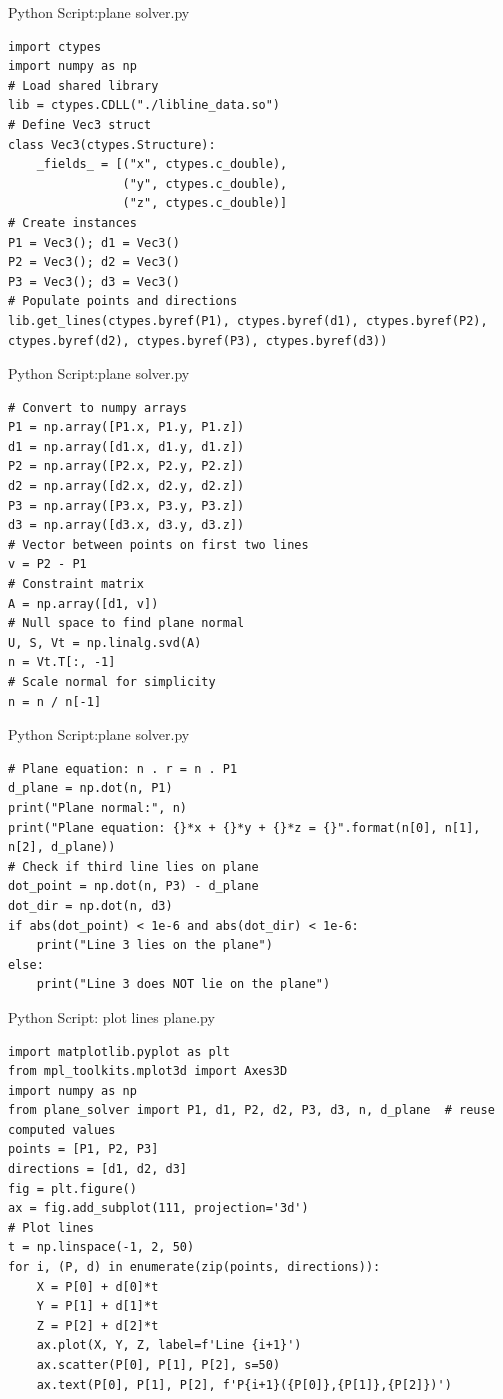 \documentclass{beamer}
\numberwithin{equation}{section}
\theoremstyle{remark}
\begin{document}
\begin{frame}[fragile]{Python Script:plane solver.py}
\begin{verbatim}
import ctypes
import numpy as np
# Load shared library
lib = ctypes.CDLL("./libline_data.so")
# Define Vec3 struct
class Vec3(ctypes.Structure):
    _fields_ = [("x", ctypes.c_double),
                ("y", ctypes.c_double),
                ("z", ctypes.c_double)]
# Create instances
P1 = Vec3(); d1 = Vec3()
P2 = Vec3(); d2 = Vec3()
P3 = Vec3(); d3 = Vec3()
# Populate points and directions
lib.get_lines(ctypes.byref(P1), ctypes.byref(d1), ctypes.byref(P2), ctypes.byref(d2), ctypes.byref(P3), ctypes.byref(d3))
\end{verbatim}
\end{frame}
\begin{frame}[fragile]{Python Script:plane solver.py}
\begin{verbatim}
# Convert to numpy arrays
P1 = np.array([P1.x, P1.y, P1.z])
d1 = np.array([d1.x, d1.y, d1.z])
P2 = np.array([P2.x, P2.y, P2.z])
d2 = np.array([d2.x, d2.y, d2.z])
P3 = np.array([P3.x, P3.y, P3.z])
d3 = np.array([d3.x, d3.y, d3.z])
# Vector between points on first two lines
v = P2 - P1
# Constraint matrix
A = np.array([d1, v])
# Null space to find plane normal
U, S, Vt = np.linalg.svd(A)
n = Vt.T[:, -1]
# Scale normal for simplicity
n = n / n[-1]
\end{verbatim}
\end{frame}
\begin{frame}[fragile]{Python Script:plane solver.py}
\begin{verbatim}
# Plane equation: n . r = n . P1
d_plane = np.dot(n, P1)
print("Plane normal:", n)
print("Plane equation: {}*x + {}*y + {}*z = {}".format(n[0], n[1], n[2], d_plane))
# Check if third line lies on plane
dot_point = np.dot(n, P3) - d_plane
dot_dir = np.dot(n, d3)
if abs(dot_point) < 1e-6 and abs(dot_dir) < 1e-6:
    print("Line 3 lies on the plane")
else:
    print("Line 3 does NOT lie on the plane")

\end{verbatim}
\end{frame}
\begin{frame}[fragile]{Python Script: plot lines plane.py}
\begin{verbatim}
import matplotlib.pyplot as plt
from mpl_toolkits.mplot3d import Axes3D
import numpy as np
from plane_solver import P1, d1, P2, d2, P3, d3, n, d_plane  # reuse computed values
points = [P1, P2, P3]
directions = [d1, d2, d3]
fig = plt.figure()
ax = fig.add_subplot(111, projection='3d')
# Plot lines
t = np.linspace(-1, 2, 50)
for i, (P, d) in enumerate(zip(points, directions)):
    X = P[0] + d[0]*t
    Y = P[1] + d[1]*t
    Z = P[2] + d[2]*t
    ax.plot(X, Y, Z, label=f'Line {i+1}')
    ax.scatter(P[0], P[1], P[2], s=50)
    ax.text(P[0], P[1], P[2], f'P{i+1}({P[0]},{P[1]},{P[2]})')
\end{verbatim}
\end{frame}
\end{document}

